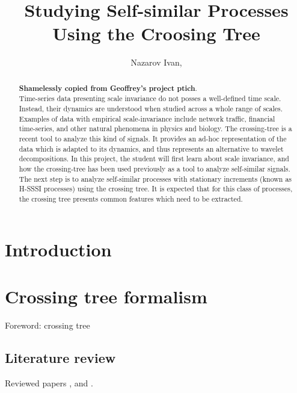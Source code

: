 \documentclass[a4paper]{report}
\title{Studying Self-similar Processes Using the Croosing Tree}
\author{Nazarov Ivan, \rus{101мНОД(ИССА)}}
\begin{document}

\clearpage


\clearpage

\maketitle
\begin{abstract}
\textbf{Shamelessly copied from Geoffrey's project ptich}.\hfill \\
Time-series data presenting scale invariance do not posses a well-defined time scale.
Instead, their dynamics are understood when studied across a whole range of scales.
Examples of data with empirical scale-invariance include network traffic, financial
time-series, and other natural phenomena in physics and biology. The crossing-tree
is a recent tool to analyze this kind of signals. It provides an ad-hoc representation
of the data which is adapted to its dynamics, and thus represents an alternative to
wavelet decompositions. In this project, the student will first learn about scale
invariance, and how the crossing-tree has been used previously as a tool to analyze
self-similar signals. The next step is to analyze self-similar processes with stationary
increments (known as H-SSSI processes) using the crossing tree. It is expected that
for this class of processes, the crossing tree presents common features which need
to be extracted.
\end{abstract}
\tableofcontents
\clearpage
{}


\chapter*{Introduction} %
\label{cha:introduction}


\chapter{Crossing tree formalism} %
\label{cha:crossing_tree_formalism}

Foreword: crossing tree

\section{Literature review} %
\label{sec:literature_review}
Reviewed papers \cite{jones2004}, \cite{jonesshen2005} and \cite{decrouez2013}.
\end{document}
